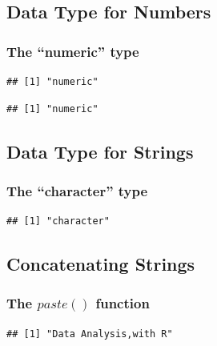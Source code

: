 \subsection{Data Type for Numbers}
\subsubsection{The ``numeric'' type}
\begin{knitrout}
\color{fgcolor}\begin{kframe}
\begin{alltt}
\hlstd{(}\hlstd{)}
\end{alltt}
\begin{verbatim}
## [1] "numeric"
\end{verbatim}
\begin{alltt}
\hlstd{(}\hlstd{)}
\end{alltt}
\begin{verbatim}
## [1] "numeric"
\end{verbatim}
\end{kframe}
\end{knitrout}
\subsection{Data Type for Strings}
\subsubsection{The ``character'' type}
\begin{knitrout}
\color{fgcolor}\begin{kframe}
\begin{alltt}
\hlstd{(}\hlstd{)}
\end{alltt}
\begin{verbatim}
## [1] "character"
\end{verbatim}
\end{kframe}
\end{knitrout}
\subsection{Concatenating Strings}
\subsubsection{The $paste()$ function}
\begin{knitrout}
\color{fgcolor}\begin{kframe}
\begin{alltt}
\hlstd{(}\hlstd{,}\hlstd{,}\hlstd{=}\hlstd{)}
\end{alltt}
\begin{verbatim}
## [1] "Data Analysis,with R"
\end{verbatim}
\end{kframe}
\end{knitrout}



